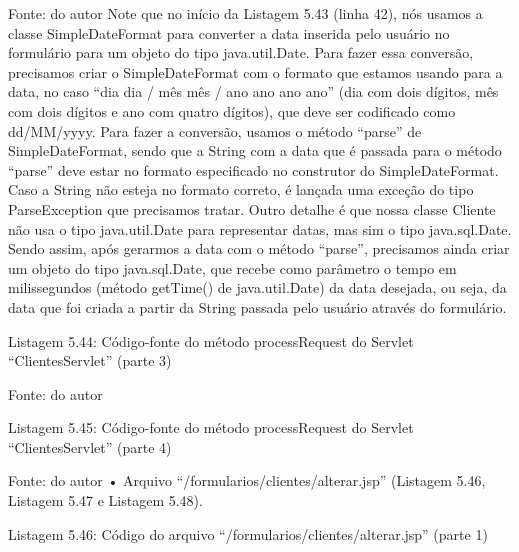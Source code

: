 Fonte: do autor
Note que no início da Listagem 5.43 (linha 42), nós usamos a classe SimpleDateFormat para converter a data inserida pelo usuário no formulário para um objeto do tipo java.util.Date. Para fazer essa conversão, precisamos criar o SimpleDateFormat com o formato que estamos usando para a data, no caso “dia dia / mês mês / ano ano ano ano” (dia com dois dígitos, mês com dois dígitos e ano com quatro dígitos), que deve ser codificado como dd/MM/yyyy.  Para fazer a conversão, usamos o método “parse” de SimpleDateFormat, sendo que a String com a data que é passada para o método “parse” deve estar no formato especificado no construtor do SimpleDateFormat. Caso a String não esteja no formato correto, é lançada uma exceção do tipo ParseException que precisamos tratar.
Outro detalhe é que nossa classe Cliente não usa o tipo java.util.Date para representar datas, mas sim o tipo java.sql.Date. Sendo assim, após gerarmos a data com o método “parse”, precisamos ainda criar um objeto do tipo java.sql.Date, que recebe como parâmetro o tempo em milissegundos (método getTime() de java.util.Date) da data desejada, ou seja, da data que foi criada a partir da String passada pelo usuário através do formulário.


















Listagem 5.44: Código-fonte do método processRequest do Servlet “ClientesServlet” (parte 3)
 
Fonte: do autor









Listagem 5.45: Código-fonte do método processRequest do Servlet “ClientesServlet” (parte 4)
 
Fonte: do autor
•	Arquivo “/formularios/clientes/alterar.jsp” (Listagem 5.46, Listagem 5.47 e Listagem 5.48).
















Listagem 5.46: Código do arquivo “/formularios/clientes/alterar.jsp” (parte 1)
 
